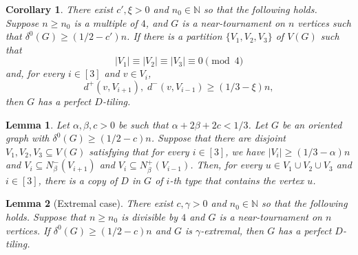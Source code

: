 \documentclass[10pt,a4paper]{amsart}
\newtheorem{lemma}{Lemma}
\newtheorem{corollary}{Corollary}
\def\N{\mathbb{N}}
\begin{document}
\begin{corollary}\label{cor:0mod4}
    There exist $c', \xi >0$ and $n_0\in \N$ so that the following holds. Suppose $n\ge n_0$ is a multiple of $4$, and $G$ is a near-tournament on $n$ vertices such that $\delta^0(G)\ge (1/2-c')n$. If there is a partition $\{V_1,V_2,V_3\}$ of $V(G)$ such that 
    \begin{equation} \label{eq:div}
        |V_1|\equiv |V_2|\equiv |V_3|\equiv 0\pmod 4
    \end{equation}
    and, for every $i\in [3]$ and $v\in V_i$, 
    \begin{equation} \label{eq:v}
        d^+(v,V_{i+1}), \; d^-(v,V_{i-1})\ge (1/3-\xi)n ,
    \end{equation}
    then $G$ has a perfect $D$-tiling.
\end{corollary}

\begin{lemma}\label{lem:ith}
    Let $\alpha, \beta, c>0$ be such that $\alpha+2\beta+2c < 1/3$. Let $G$ be an oriented graph with $\delta^0(G)\ge (1/2-c)n$. Suppose that there are disjoint $V_1,V_2,V_3\subseteq V(G)$ satisfying that for every $i\in [3]$, we have $|V_i|\ge (1/3-\alpha)n$ and $V_i\subseteq N^-_\beta(V_{i+1})$ and $V_i\subseteq N^+_\beta(V_{i-1})$. Then, for every $u\in V_1\cup V_2\cup V_3$ and $i \in [3]$, there is a copy of $D$ in $G$ of $i$-th type that contains the vertex $u$.
\end{lemma}

\begin{lemma}[Extremal case] \label{lem:extremal}
    There exist $c, \gamma >0$ and $n_0\in \N$ so that the following holds. Suppose that $n\ge n_0$ is divisible by $4$ and $G$ is a near-tournament on $n$ vertices. 
    If $\delta^0(G)\ge (1/2-c)n$ and $G$ is $\gamma$-extremal, then $G$ has a perfect $D$-tiling.
\end{lemma}
\end{document}

